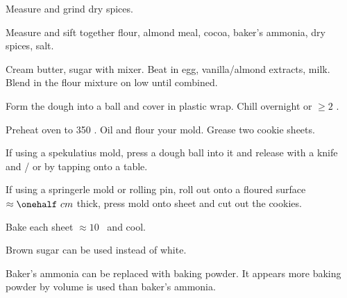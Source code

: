 \begin{preparation}
\item Measure and grind dry spices.

\item Measure and sift together flour, almond meal, cocoa, baker's ammonia,
    dry spices, salt.

\item Cream butter, sugar with mixer.
    Beat in egg, vanilla/almond extracts, milk.
    Blend in the flour mixture on low until combined.

\item Form the dough into a ball and cover in plastic wrap.
    Chill overnight or $\ge 2$ \hour.

\item Preheat oven to 350 \Fahrenheit.
    Oil and flour your mold.
    Grease two cookie sheets.

\item If using a spekulatius mold, press a dough ball into it and release
    with a knife and / or by tapping onto a table.

\item If using a springerle mold or rolling pin, roll out onto a floured
    surface $\approx \onehalf~cm$ thick, press mold onto sheet and cut out the cookies.

\item Bake each sheet $\approx 10$ \minute~and cool.
\end{preparation}

\begin{variation}
\item Brown sugar can be used instead of white.
\end{variation}

\begin{experiments}
\item Baker's ammonia can be replaced with baking powder.
    It appears more baking powder by volume is used than baker's ammonia.
\end{experiments}

\recipeend%
